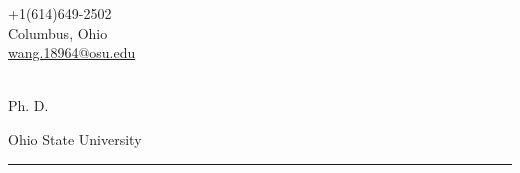 \begin{center}
    \author{Huaijin Wang}
    \def\role{Ph. D.}
	\begin{minipage}[b]{.3\textwidth}
	\raggedright
	{\large +1(614)649-2502} \\ %
	{Columbus, Ohio} \\ %
	\def\email{wang.18964@osu.edu}
	\href{mailto:\email}{\email} %
	\end{minipage}%
	\begin{minipage}[b]{.4\textwidth}
	\makeatletter
	\centering {\HUGE \@author} \\
	\makeatother
    \vspace{.5em}
    {\color{highlight} \Large{\role}}
	\end{minipage}%
	\begin{minipage}[b]{.3\textwidth}
	\raggedleft
	Ohio State University 
	\end{minipage}

{\color{highlight} \hrule}
\end{center}
